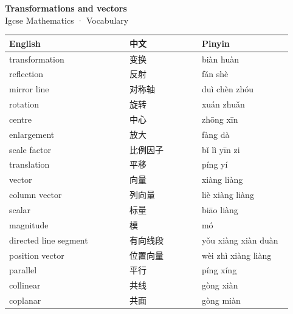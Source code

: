 \documentclass[11pt]{article}
\begin{document}
\begin{center}
  {\LARGE\bfseries Transformations and vectors}\\[0.35em]
  {\large Igcse Mathematics · Vocabulary}
\end{center}
\vspace{0.6em}

\begin{longtable}{@{}p{0.40\linewidth}p{0.24\linewidth}p{0.30\linewidth}@{}}
\toprule
\textbf{English} & \textbf{中文} & \textbf{Pinyin} \\
\midrule
\endhead
\bottomrule
\endlastfoot
transformation & 变换 & biàn huàn \\
reflection & 反射 & fǎn shè \\
mirror line & 对称轴 & duì chèn zhóu \\
rotation & 旋转 & xuán zhuǎn \\
centre & 中心 & zhōng xīn \\
enlargement & 放大 & fàng dà \\
scale factor & 比例因子 & bǐ lì yīn zi \\
translation & 平移 & píng yí \\
vector & 向量 & xiàng liàng \\
column vector & 列向量 & liè xiàng liàng \\
scalar & 标量 & biāo liàng \\
magnitude & 模 & mó \\
directed line segment & 有向线段 & yǒu xiàng xiàn duàn \\
position vector & 位置向量 & wèi zhì xiàng liàng \\
parallel & 平行 & píng xíng \\
collinear & 共线 & gòng xiàn \\
coplanar & 共面 & gòng miàn \\
\end{longtable}
\end{document}
